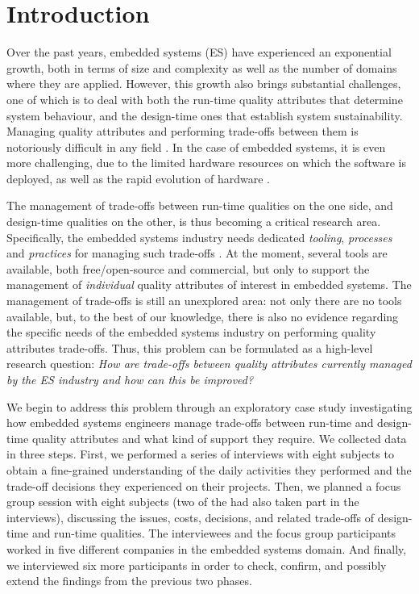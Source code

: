 \section{Introduction}\label{c7:sec:intro}
Over the past years, embedded systems (ES) have experienced an exponential growth, both in terms of size and complexity as well as the number of domains where they are applied.
However, this growth also brings substantial challenges, one of which is to deal with both the run-time quality attributes that determine system behaviour, and the design-time ones that establish system sustainability.
Managing quality attributes and performing trade-offs between them is notoriously difficult in any field \cite{Bass2012}.
In the case of embedded systems, it is even more challenging, due to the limited hardware resources on which the software is deployed, as well as the rapid evolution of hardware \cite{Mallick2009}. 

The management of trade-offs between run-time qualities on the one side, and design-time qualities on the other, is thus becoming a critical research area. Specifically, the embedded systems industry needs dedicated \textit{tooling}, \textit{processes} and \textit{practices} for managing such trade-offs \cite{Ampatzoglou2016}.
At the moment, several tools are available, both free/open-source and commercial, but only to support the management of \textit{individual} quality attributes of interest in embedded systems.
The management of trade-offs is still an unexplored area: not only there are no tools available, but, to the best of our knowledge, there is also no evidence regarding the specific needs of the embedded systems industry on performing quality attributes trade-offs. 
Thus, this problem can be formulated as a high-level research question: \textit{How are trade-offs between quality attributes currently managed by the ES industry and how can this be improved?} 

We begin to address this problem through an exploratory case study  investigating how  embedded systems engineers manage trade-offs between run-time and design-time quality attributes and what kind of support they require.
We collected data in three steps. 
First, we performed a series of interviews with eight subjects to obtain a fine-grained understanding of the daily activities they performed and the trade-off decisions they experienced on their projects.
Then, we planned a focus group session with eight subjects (two of the had also taken part in the interviews), discussing the issues, costs, decisions, and related trade-offs of design-time and run-time qualities. The interviewees and the focus group participants worked in five different companies in the embedded systems domain. 
And finally, we interviewed six more participants in order to check, confirm, and possibly extend the findings from the previous two phases.

